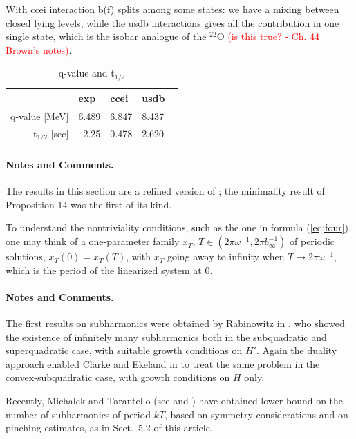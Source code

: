 \documentclass{llncs}
\begin{document}
With ccei interaction b(f) splits among some states: we have a mixing between closed lying levels, while the usdb interactions gives all the contribution in one single state, which is the isobar analogue of the $^{22}$O \textcolor{red}{(is this true? - Ch. 44 Brown's notes)}.

\begin{table}
\caption{q-value and t$_{1/2}$}
\begin{center}
\begin{tabular}{r@{\qquad}r@{\qquad}r@{\qquad}r@{\qquad}l}
\hline
\multicolumn{1}{l}{\rule{0pt}{12pt}
                   }&\multicolumn{1}{l}{exp}&\multicolumn{1}{l}{ccei}&\multicolumn{2}{l}{usdb}\\[2pt]
\hline\rule{0pt}{12pt}
q-value [MeV]   &     6.489 & 6.847 & 8.437 &\\
t$_{1/2}$ [sec] &     2.25  & 0.478 & 2.620 &\\[2pt]
\hline
\end{tabular}
\end{center}
\end{table}


%
\paragraph{Notes and Comments.}
The results in this section are a
refined version of \cite{clar:eke};
the minimality result of Proposition
14 was the first of its kind.

To understand the nontriviality conditions, such as the one in formula
(\ref{eq:four}), one may think of a one-parameter family
$x_{T}$, $T\in \left(2\pi\omega^{-1}, 2\pi b_{\infty}^{-1}\right)$
of periodic solutions, $x_{T} (0) = x_{T} (T)$,
with $x_{T}$ going away to infinity when $T\to 2\pi \omega^{-1}$,
which is the period of the linearized system at 0.

\paragraph{Notes and Comments.}
The first results on subharmonics were
obtained by Rabinowitz in \cite{rab}, who showed the existence of
infinitely many subharmonics both in the subquadratic and superquadratic
case, with suitable growth conditions on $H'$. Again the duality
approach enabled Clarke and Ekeland in \cite{clar:eke:2} to treat the
same problem in the convex-subquadratic case, with growth conditions on
$H$ only.

Recently, Michalek and Tarantello (see \cite{mich:tar} and \cite{tar})
have obtained lower bound on the number of subharmonics of period $kT$,
based on symmetry considerations and on pinching estimates, as in
Sect.~5.2 of this article.
\end{document}
